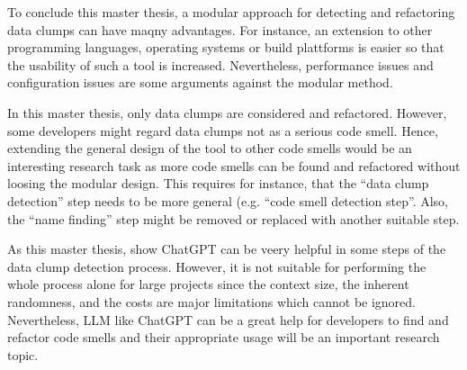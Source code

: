 To conclude this master thesis, a modular approach for detecting and refactoring data clumps can have maqny advantages.  For instance, an extension to other programming languages, operating systems or build plattforms is easier so that the usability of such a tool is increased. Nevertheless, performance issues and configuration issues are some arguments against the modular method. 

In this master thesis, only data clumps are considered and refactored. However, some developers might regard data clumps not as a serious code smell. Hence, extending the general design of the tool to other code smells would be an interesting research task as more code smells can be found and refactored without loosing the modular design. This requires for instance, that the \enquote{data clump detection} step needs to be more general (e.g. \enquote{code smell detection step}. Also, the \enquote{name finding} step might be removed or replaced with another suitable step. 

As this master thesis, show ChatGPT can be veery helpful in some steps of the data clump detection process. However, it is not suitable for performing the whole process alone for large projects since the context size, the inherent randomness, and the costs are major limitations which cannot be ignored. Nevertheless, \ac{LLM} like ChatGPT can be a great help for developers to find and refactor code smells and their appropriate usage will be an important research topic. 

